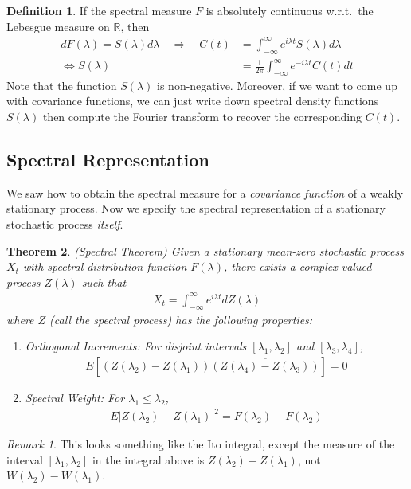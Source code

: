 \documentclass[12pt]{article}
\theoremstyle{plain}
\newtheorem{thm}{Theorem}[section]
\theoremstyle{definition}
\newtheorem{defn}[thm]{Definition}
\theoremstyle{remark}
\newtheorem*{rmk}{Remark}
\begin{document}
\begin{defn}
If the spectral measure $F$ is absolutely continuous w.r.t.\ the
Lebesgue measure on $\mathbb{R}$, then
\begin{align*}
  dF(\lambda) = S(\lambda)d\lambda
  \quad \Rightarrow\quad
  C(t)
    &= \int^\infty_{-\infty} e^{i\lambda t} S(\lambda) d\lambda \\
  \Leftrightarrow
  S(\lambda)
    &= \frac{1}{2\pi} \int^\infty_{-\infty} e^{-i\lambda t} C(t) dt
\end{align*}
Note that the function $S(\lambda)$ is non-negative. Moreover, if we
want to come up with covariance functions, we can just write down
spectral density functions $S(\lambda)$ then compute the Fourier
transform to recover the corresponding $C(t)$.
\end{defn}

\subsection{Spectral Representation}

We saw how to obtain the spectral measure for a \emph{covariance
function} of a weakly stationary process. Now we specify the spectral
representation of a stationary stochastic process \emph{itself}.

\begin{thm}\emph{(Spectral Theorem)}
Given a stationary mean-zero stochastic process $X_t$ with spectral
distribution function $F(\lambda)$, there exists a complex-valued
process $Z(\lambda)$ such that
\begin{align*}
  X_t = \int^\infty_{-\infty} e^{i\lambda t} dZ(\lambda)
\end{align*}
where $Z$ (call the \emph{spectral process}) has the following
properties:
\begin{enumerate}
  \item Orthogonal Increments: For disjoint intervals
    $[\lambda_1,\lambda_2]$ and $[\lambda_3,\lambda_4]$,
    \begin{align*}
      E\left[
        (Z(\lambda_2)-Z(\lambda_1))
        \overline{(Z(\lambda_4)-Z(\lambda_3))}
      \right] = 0
    \end{align*}
  \item Spectral Weight: For $\lambda_1\leq \lambda_2$,
    \begin{align*}
      E\left\lvert Z(\lambda_2)-Z(\lambda_1)\right\rvert^2
      = F(\lambda_2)-F(\lambda_2)
    \end{align*}
\end{enumerate}
\end{thm}
\begin{rmk}
This looks something like the Ito integral, except the measure of the
interval $[\lambda_1,\lambda_2]$ in the integral above is
$Z(\lambda_2)-Z(\lambda_1)$, not $W(\lambda_2)-W(\lambda_1)$.
\end{rmk}
\end{document}
